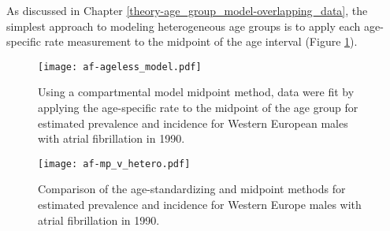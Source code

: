 As discussed in Chapter \ref{theory-age_group_model-overlapping_data}, the simplest approach to modeling heterogeneous age groups is to apply each age-specific rate measurement to the midpoint of the age interval (Figure \ref{fig:app-af mp data}).

    \begin{figure}[h]
        \begin{center}
            \texttt{[image: af-ageless\_model.pdf]}
            \caption{Using a compartmental model midpoint method, data were fit by applying the age-specific rate to the midpoint of the age group for estimated prevalence and incidence for Western European males with atrial fibrillation in 1990.}
            \label{fig:app-af mp data}
        \end{center}
    \end{figure}

    \begin{figure}[h]
        \begin{center}
            \texttt{[image: af-mp\_v\_hetero.pdf]}
            \caption{Comparison of the age-standardizing and midpoint methods for estimated prevalence and incidence for Western Europe males with atrial fibrillation in 1990.}
            \label{fig:app-af mp}
        \end{center}
    \end{figure}
